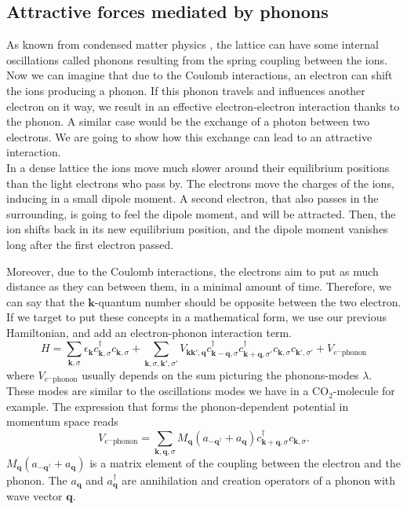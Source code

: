 \documentclass[../main.tex]{subfile}
\begin{document}
\subsection{Attractive forces mediated by phonons}
As known from condensed matter physics \cite{GrossMarx2013}, the lattice can have some internal oscillations called phonons resulting from the spring coupling between the ions.
Now we can imagine that due to the Coulomb interactions, an electron can shift the ions producing a phonon. If this phonon travels and influences another electron
on it way, we result in an effective electron-electron interaction thanks to the phonon. A similar case would be the exchange of a photon between two electrons.
We are going to show how this exchange can lead to an attractive interaction.\\

In a dense lattice the ions move much slower around their equilibrium positions than the light electrons who pass by. The electrons move the charges of the ions, inducing
in a small dipole moment. A second electron, that also passes in the surrounding, is going to feel the dipole moment, and will be 
attracted. Then, the ion shifts back in its new equilibrium position, and the dipole moment vanishes long after the first electron passed.

Moreover, due to the Coulomb interactions, the electrons aim to put as much distance as they can between them, in a minimal amount of time. Therefore,
we can say that the $\bm{k}$-quantum number should be opposite between the two electron. If we target to put these concepts in a mathematical form, we use
our previous Hamiltonian, and add an electron-phonon interaction term.
\[
    H = \sum_{\bm{k},\sigma} \epsilon_{\bm{k}} c_{\bm{k},\sigma}^{\dagger}c_{\bm{k},\sigma} + \sum_{\bm{k},\sigma,\bm{k}',\sigma'}
        V_{\bm{k}\bm{k}', \bm{q}} c_{\bm{k}-\bm{q},\sigma}^{\dagger}c_{\bm{k}+\bm{q},\sigma'}^{\dagger}c_{\bm{k},\sigma}c_{\bm{k}',\sigma'} + V_{e^-\text{phonon}}
\]
where $V_{e^-\text{phonon}}$ usually depends on the sum picturing the phonons-modes $\lambda$. These modes are similar to the oscillations modes we have in a CO$_2$-molecule for example.
The expression that forms the phonon-dependent potential in momentum space reads 
\begin{equation} \label{eq:Pot_phonon_interaction}
    V_{e^-\text{phonon}} = \sum_{\bm{k},\bm{q},\sigma} M_{\bm{q}}\left(a_{-\bm{q}^{\dagger}} + a_{\bm{q}}\right) c_{\bm{k}+\bm{q},\sigma}^{\dagger}c_{\bm{k},\sigma}.
\end{equation}
$M_{\bm{q}}\left(a_{-\bm{q}^{\dagger}} + a_{\bm{q}}\right) $ is a matrix element of the coupling between the electron and the phonon. 
The $a_{\bm{q}}$ and $a_{\bm{q}}^{\dagger}$ are annihilation and creation operators of a phonon with wave vector $\bm{q}$.\\
\end{document}
